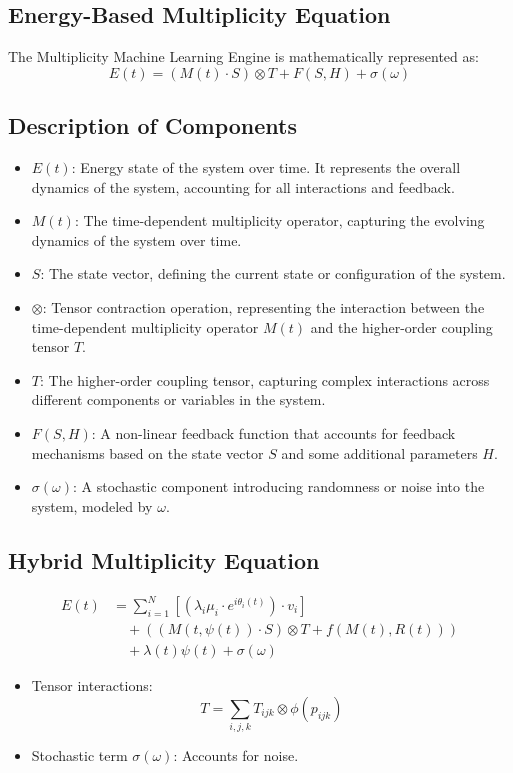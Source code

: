 \documentclass{article}
\theoremstyle{plain}
\begin{document}
\subsection{Energy-Based Multiplicity Equation}

The Multiplicity Machine Learning Engine is mathematically represented as:
\begin{equation}
E(t) = (M(t) \cdot S) \otimes T + F(S, H) + \sigma(\omega)
\end{equation}

\subsection{Description of Components}
\begin{itemize}
    \item \textbf{\( E(t) \)}: Energy state of the system over time. It represents the overall dynamics of the system, accounting for all interactions and feedback.
    \item \textbf{\( M(t) \)}: The time-dependent multiplicity operator, capturing the evolving dynamics of the system over time.
    \item \textbf{\( S \)}: The state vector, defining the current state or configuration of the system.
    \item \textbf{\( \otimes \)}: Tensor contraction operation, representing the interaction between the time-dependent multiplicity operator \( M(t) \) and the higher-order coupling tensor \( T \).
    \item \textbf{\( T \)}: The higher-order coupling tensor, capturing complex interactions across different components or variables in the system.
    \item \textbf{\( F(S, H) \)}: A non-linear feedback function that accounts for feedback mechanisms based on the state vector \( S \) and some additional parameters \( H \).
    \item \textbf{\( \sigma(\omega) \)}: A stochastic component introducing randomness or noise into the system, modeled by \( \omega \).
\end{itemize}
\subsection{Hybrid Multiplicity Equation}
\begin{align}
E(t) &= \sum_{i=1}^N \left[ \left( \lambda_i \mu_i \cdot e^{i\theta_i(t)} \right) \cdot v_i \right] \nonumber \\
&\quad + \left( (M(t, \psi(t)) \cdot S) \otimes T + f(M(t), R(t)) \right) \nonumber \\
&\quad + \lambda(t)\psi(t) + \sigma(\omega)
\end{align}
\begin{itemize}
    \item Tensor interactions:
    \[
    T = \sum_{i,j,k} T_{ijk} \otimes \phi(p_{ijk})
    \]
    \item Stochastic term \( \sigma(\omega) \): Accounts for noise.
\end{itemize}
\end{document}
